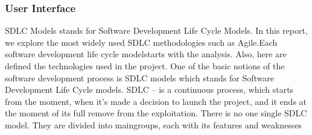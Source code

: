 \documentclass[12pt]{report}
\begin{document}
\justifying
\setlength{\parindent}{4em}
\setlength{\parskip}{0.5em}
\renewcommand{\baselinestretch}{1.5}
\subsubsection{ User Interface}
\normalsize
SDLC Models stands for Software Development Life Cycle Models. In this report, we explore 
the most widely used SDLC methodologies such as Agile.Each software development life 
cycle modelstarts with the analysis. Also, here are defined the technologies used in the project.
One of the basic notions of the software development process is SDLC models which stands 
for Software Development Life Cycle models. SDLC – is a continuous process, which starts 
from the moment, when it’s made a decision to launch the project, and it ends at the moment 
of its full remove from the exploitation. There is no one single SDLC model. They are divided 
into maingroups, each with its features and weaknesses
\end{document}
